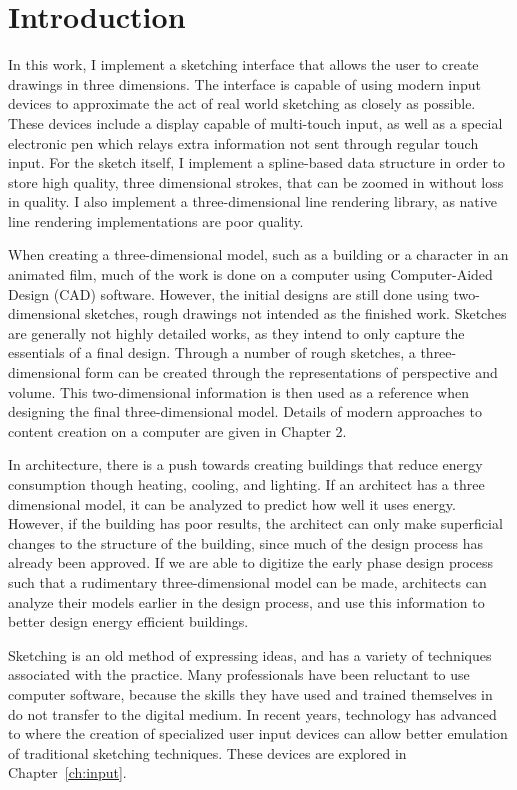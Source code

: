 \chapter{Introduction}

In this work, I implement a sketching interface that allows the user to create drawings in three dimensions.
The interface is capable of using modern input devices to approximate the act of real world sketching as closely as possible.
These devices include a display capable of multi-touch input, as well as a special electronic pen which relays extra information
not sent through regular touch input.
For the sketch itself, I implement a spline-based data structure in order to store high quality, three dimensional strokes, that can be zoomed in without loss in quality.
I also implement a three-dimensional line rendering library, as native line rendering implementations are poor quality.

When creating a three-dimensional model, such as a building or a character in an animated film, much of the work is done on a computer using Computer-Aided Design (CAD) software.
However, the initial designs are still done using two-dimensional sketches, rough drawings not intended as the finished work.
Sketches are generally not highly detailed works, as they intend to only capture the essentials of a final design.
Through a number of rough sketches, a three-dimensional form can be created through the representations of perspective and volume.
This two-dimensional information is then used as a reference when designing the final three-dimensional model.
Details of modern approaches to content creation on a computer are given in Chapter 2.

In architecture, there is a push towards creating buildings that reduce energy consumption though heating, cooling, and lighting.
If an architect has a three dimensional model, it can be analyzed to predict how well it uses energy.
However, if the building has poor results, the architect can only make superficial changes to the structure of the building, since much of the design process has already been approved.
If we are able to digitize the early phase design process such that a rudimentary three-dimensional model can be made, architects can analyze their models earlier in the design process, and use this information to better design energy efficient buildings.

Sketching is an old method of expressing ideas, and has a variety of techniques associated with the practice.
Many professionals have been reluctant to use computer software, because the skills they have used and trained themselves in do not transfer to the digital medium.
In recent years, technology has advanced to where the creation of specialized user input devices can allow better emulation of traditional sketching techniques.
These devices are explored in Chapter~\ref{ch:input}.

